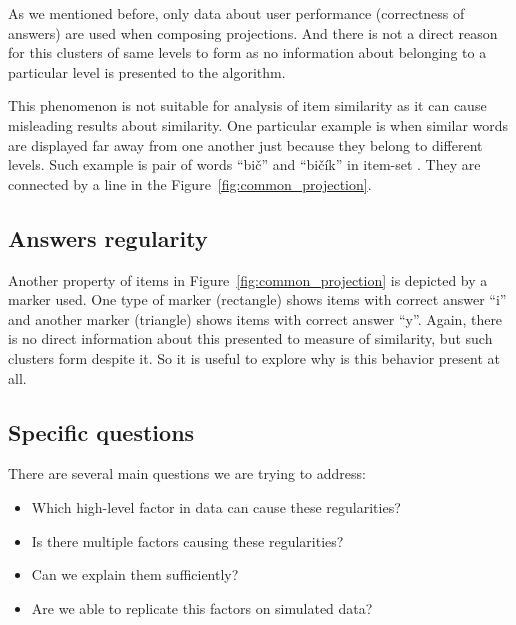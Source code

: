 \documentclass[
  printed, %
  table,   %
  nolof,     %
  nolot,     %
  color,
  final,
  nocover
]{fithesis3}
\begin{document}
As we mentioned before, only data about user performance (correctness of answers) are used when composing projections. And there is not a direct reason for this clusters of same levels to form as no information about belonging to a particular level is presented to the algorithm.


This phenomenon is not suitable for analysis of item similarity as it can cause misleading results about similarity. One particular example is when similar words are displayed far away from one another just because they belong to different levels. Such example is pair of words ``bič'' and ``bičík'' in item-set \cviceniB{}. They are connected by a line in the Figure~\ref{fig:common_projection}.


\subsection{Answers regularity}\label{answers-regularity}

Another property of items in Figure~\ref{fig:common_projection} is depicted by a marker used. One type of marker (rectangle) shows items with correct answer ``i'' and another marker (triangle) shows items with correct answer ``y''. Again, there is no direct information about this presented to measure of similarity, but such clusters form despite it. So it is useful to explore why is this behavior present at all.


\subsection{Specific questions}\label{specific-questions}

There are several main questions we are trying to address:

\begin{itemize}
 \item Which high-level factor in data can cause these regularities?
 \item Is there multiple factors causing these regularities?
 \item Can we explain them sufficiently?
 \item Are we able to replicate this factors on simulated data?
\end{itemize}
\end{document}
